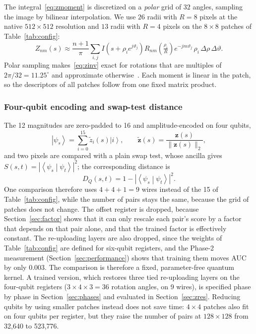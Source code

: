 \documentclass[conference]{IEEEtran}
\newcommand{\ket}[1]{\left|#1\right\rangle}
\newcommand{\braket}[2]{\left\langle#1\middle|#2\right\rangle}
\begin{document}
The integral~\eqref{eq:zmoment} is discretized on a \emph{polar} grid of $32$ angles, sampling the image by bilinear interpolation. We use $26$ radii with $R = 8$ pixels at the native $512\times512$ resolution and $13$ radii with $R = 4$ pixels on the $8\times8$ patches of Table~\ref{tab:config}:
\begin{equation}
Z_{nm}(s) \approx \frac{n+1}{\pi}\sum_{i,j} I\!\left(s + \rho_i e^{j\vartheta_j}\right) R_{nm}\!\left(\tfrac{\rho_i}{R}\right) e^{-jm\vartheta_j}\,\rho_i\,\Delta\rho\,\Delta\vartheta .
\label{eq:zdiscrete}
\end{equation}
Polar sampling makes~\eqref{eq:zinv} exact for rotations that are multiples of $2\pi/32 = 11.25^\circ$ and approximate otherwise~\cite{xin2007}. Each moment is linear in the patch, so the descriptors of all patches follow from one fixed matrix product.

\subsubsection{Four-qubit encoding and swap-test distance}
The 12 magnitudes are zero-padded to 16 and amplitude-encoded on four qubits,
\begin{equation}
\ket{\psi_s} = \sum_{i=0}^{15} \tilde{z}_i(s)\ket{i}, \qquad \tilde{\mathbf{z}}(s) = \frac{\mathbf{z}(s)}{\|\mathbf{z}(s)\|_2},
\label{eq:zenc}
\end{equation}
and two pixels are compared with a plain swap test, whose ancilla gives $S(s,t) = |\braket{\psi_s}{\psi_t}|^2$; the corresponding distance is
\begin{equation}
D_Q(s,t) = 1 - \left|\braket{\psi_s}{\psi_t}\right|^2 .
\label{eq:dq}
\end{equation}
One comparison therefore uses $4+4+1 = 9$ wires instead of the 15 of Table~\ref{tab:config}, while the number of pairs stays the same, because the grid of patches does not change. The offset register is dropped, because Section~\ref{sec:factor} shows that it can only rescale each pair's score by a factor that depends on that pair alone, and that the trained factor is effectively constant. The re-uploading layers are also dropped, since the weights of Table~\ref{tab:config} are defined for six-qubit registers, and the Phase-2 measurement (Section~\ref{sec:performance}) shows that training them moves AUC by only $0.003$. The comparison is therefore a fixed, parameter-free quantum kernel. A trained version, which restores three tied re-uploading layers on the four-qubit registers ($3\times4\times3 = 36$ rotation angles, on 9 wires), is specified phase by phase in Section~\ref{sec:phases} and evaluated in Section~\ref{sec:zres}. Reducing qubits by using smaller patches instead does not save time: $4\times4$ patches also fit on four qubits per register, but they raise the number of pairs at $128\times128$ from 32,640 to 523,776.
\end{document}
